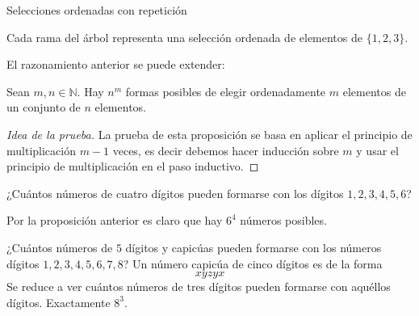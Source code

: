 \begin{section}{Selecciones ordenadas con repetición}
\begin{ejemplo*}



Cada rama del árbol representa una selección ordenada de elementos de $ \{ 1, 2, 3 \}$.

\end{ejemplo*}

El razonamiento anterior  se puede extender:

\begin{proposicion}
Sean  $m,n \in \mathbb N$. Hay   $n^m$ formas posibles de elegir ordenadamente $m$ elementos de un conjunto de $n$ elementos.
\end{proposicion}
\begin{proof}[Idea de la prueba]
La prueba de esta proposición se basa en aplicar el principio de multiplicación $m-1$ veces, es decir debemos hacer inducción sobre $m$ y usar el principio de multiplicación en el paso inductivo. 
\end{proof}

\begin{ejemplo*}
¿Cuántos números de cuatro dígitos pueden formarse con
los dígitos $1, 2, 3, 4, 5, 6$?

Por la proposición anterior es claro que hay $6^4$ números posibles.
\end{ejemplo*}


\begin{ejemplo*}
¿Cuántos números de $5$ dígitos y capicúas pueden formarse
con los números dígitos $1, 2, 3, 4, 5, 6, 7, 8$? Un número
capicúa de cinco dígitos es de la forma
$$xyzyx$$
Se reduce a ver cuántos números de tres dígitos pueden
formarse con aquéllos dígitos.
Exactamente $8^3$.
\end{ejemplo*}



 


\end{section}
